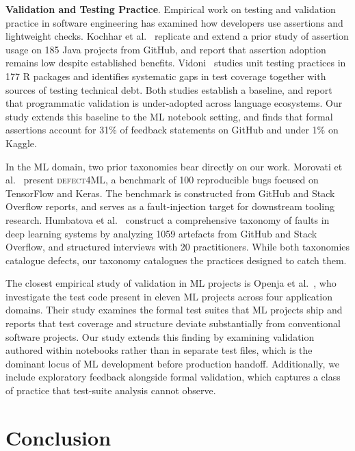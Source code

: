 \documentclass[a4paper,USenglish,cleveref,autoref,thm-restate,anonymous]{lipics-v2021}       %
\begin{document}
\textbf{Validation and Testing Practice}.
Empirical work on testing and validation practice in software engineering
has examined how developers use assertions and lightweight checks.
Kochhar et al.~\cite{kochhar2017revisiting} replicate and extend a prior study
of assertion usage on 185 Java projects from GitHub,
and report that assertion adoption remains low despite established benefits.
Vidoni~\cite{vidoni2021evaluating} studies unit testing practices in 177 R packages
and identifies systematic gaps in test coverage
together with sources of testing technical debt.
Both studies establish a baseline,
and report that programmatic validation is under-adopted across language ecosystems.
Our study extends this baseline to the ML notebook setting,
and finds that formal assertions account for 31\% of feedback statements
on GitHub and under 1\% on Kaggle.

In the ML domain,
two prior taxonomies bear directly on our work.
Morovati et al.~\cite{morovati2023bugs} present \textsc{defect4ML},
a benchmark of 100 reproducible bugs
focused on TensorFlow and Keras.
The benchmark is constructed from GitHub and Stack Overflow reports,
and serves as a fault-injection target for downstream tooling research.
Humbatova et al.~\cite{humbatova2020taxonomy} construct a comprehensive taxonomy of faults
in deep learning systems
by analyzing 1059 artefacts from GitHub and Stack Overflow,
and structured interviews with 20 practitioners.
While both taxonomies catalogue defects,
our taxonomy catalogues the practices designed to catch them.

The closest empirical study of validation in ML projects
is Openja et al.~\cite{openja2024empirical},
who investigate the test code present in eleven ML projects across four application domains.
Their study examines the formal test suites that ML projects ship
and reports that test coverage and structure
deviate substantially from conventional software projects.
Our study extends this finding
by examining validation authored within notebooks
rather than in separate test files,
which is the dominant locus of ML development before production handoff.
Additionally, we include exploratory feedback alongside formal validation,
which captures a class of practice that test-suite analysis cannot observe.

\section{Conclusion}
\end{document}
